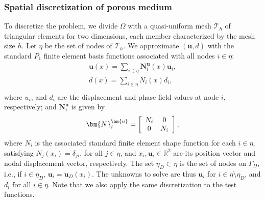 \subsubsection{Spatial discretization of porous medium}\label{sub:spatial_porous}
To discretize the problem, we divide $\Omega$ with a quasi-uniform mesh $\mathscr{T}_h$ of triangular elements for two dimensions, each member characterized by the mesh size $h$. 
Let $\eta$ be the set of nodes of $\mathscr{T}_h$. We approximate $(\bm{u},d)$ with the standard {$P_1$} finite element basis functions associated with all nodes $i \in\eta$:
\begin{equation}\label{Eq:discretization}
    \begin{aligned}
        \bm{u}(x)=\sum_{i\in\eta} \bm{N}^{\bm{u}}_{i}(x) \mathbf{u}_i,\\
	    d(x)=\sum_{i\in\eta}N_i(x) d_i,\\
	\end{aligned}
\end{equation}
where $u_i$, and $d_i$ are the displacement and phase field values at node $i$, respectively; and $\bm{N}^{\bm{u}}_{i}$ is given by
\begin{equation*}
    \begin{aligned}
        \bm{N}^{\bm{u}}_{i}=\left[
		\begin{array}{c c}
			N_i &  0 \\
			0 & N_i
		\end{array}
		\right],
    \end{aligned}
\end{equation*}
where $N_i$ is the associated standard finite element shape function for each $i\in\eta$, satisfying $N_j(x_i)=\delta_{ji}$, for all $j\in\eta$, and $x_i, \mathbf{u}_i\in\mathbb{R}^{2}$ are its position vector and nodal displacement vector, respectively. The set $\eta_D \subset \eta$ is the set of nodes on  $\Gamma_D$, i.e., if $i\in\eta_D$, $\mathbf{u}_i = \mathbf{u}_D(x_i)$. The unknowns to solve are thus $\mathbf{u}_i$ for $i\in\eta\setminus\eta_D$, and $d_i$ for all $i\in\eta$. Note that we also apply the same discretization to the test functions.


